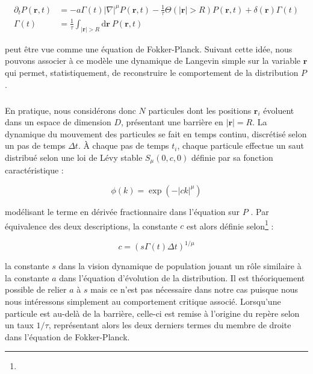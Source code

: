 \begin{equation}
\begin{aligned}
    \partial_t P(\mathbf{r}, t) &= -a\Gamma (t)|\nabla|^{\mu} P(\mathbf{r}, t) - \frac{1}{\tau}\Theta(|\mathbf{r}|>R)P(\mathbf{r}, t) + \delta(\mathbf{r})\Gamma (t)\\
     \Gamma (t) &= \frac{1}{\tau}\int_{|\mathbf{r}|>R}\mathrm{d}\mathbf{r}~P(\mathbf{r}, t)
\end{aligned}
\end{equation}

\noindent peut être vue comme une équation de Fokker-Planck. Suivant cette idée, nous pouvons associer à ce modèle une dynamique de Langevin simple sur la variable $\mathbf{r}$ qui permet, statistiquement, de reconstruire le comportement de la distribution $P$.

\subparagraph{}En pratique, nous considérons donc $N$ particules dont les positions $\mathbf{r}_i$ évoluent dans un espace de dimension $D$, présentant une barrière en $|\mathbf{r}|=R$. La dynamique du mouvement des particules se fait en temps continu, discrétisé selon un pas de temps $\Delta t$. \`A chaque pas de temps $t_i$, chaque particule effectue un saut distribué selon une loi de Lévy stable $S_\mu(0,c,0)$ définie par sa fonction caractéristique :

\begin{equation}
	\phi(k) = \exp (-|ck|^\mu)
\end{equation}

\noindent modélisant le terme en dérivée fractionnaire dans l'équation sur $P$ \cite{hinrichsen_non_equilibrium_2007, jespersen_levy_1999}. Par équivalence des deux descriptions, la constante $c$ est alors définie selon\footnote{} :

\begin{equation}
	c = \left( s \Gamma(t) \Delta t \right)^{1/\mu}
\end{equation}

\noindent la constante $s$ dans la vision dynamique de population jouant un rôle similaire à la constante $a$ dans l'équation d'évolution de la distribution. Il est théoriquement possible de relier $a$ à $s$ mais ce n'est pas nécessaire dans notre cas puisque nous nous intéressons simplement au comportement critique associé. Lorsqu'une particule est au-delà de la barrière, celle-ci est remise à l'origine du repère selon un taux $1/\tau$, représentant alors les deux derniers termes du membre de droite dans l'équation de Fokker-Planck.

